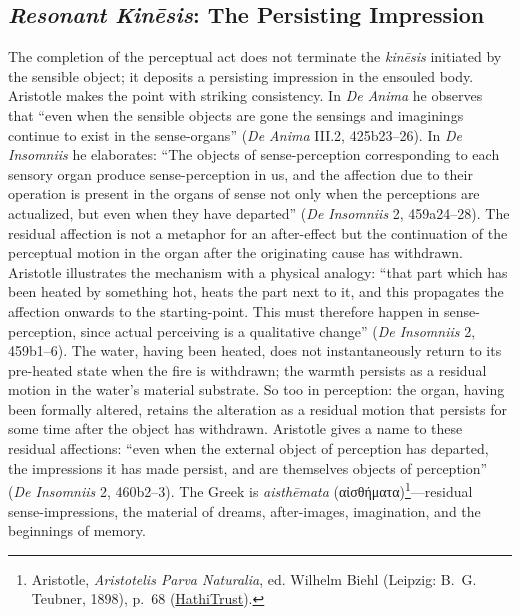 \documentclass{article}
\newcommand{\gk}[1]{{\greekfont #1}}
\begin{document}
\subsection{\textit{Resonant Kinēsis}: The Persisting Impression}

The completion of the perceptual act does not terminate the \textit{kinēsis} initiated by the sensible object; it deposits a persisting impression in the ensouled body. Aristotle makes the point with striking consistency. In \textit{De Anima} he observes that ``even when the sensible objects are gone the sensings and imaginings continue to exist in the sense-organs'' (\textit{De Anima} III.2, 425b23--26). In \textit{De Insomniis} he elaborates: ``The objects of sense-perception corresponding to each sensory organ produce sense-perception in us, and the affection due to their operation is present in the organs of sense not only when the perceptions are actualized, but even when they have departed'' (\textit{De Insomniis} 2, 459a24--28). The residual affection is not a metaphor for an after-effect but the continuation of the perceptual motion in the organ after the originating cause has withdrawn. Aristotle illustrates the mechanism with a physical analogy: ``that part which has been heated by something hot, heats the part next to it, and this propagates the affection onwards to the starting-point. This must therefore happen in sense-perception, since actual perceiving is a qualitative change'' (\textit{De Insomniis} 2, 459b1--6). The water, having been heated, does not instantaneously return to its pre-heated state when the fire is withdrawn; the warmth persists as a residual motion in the water's material substrate. So too in perception: the organ, having been formally altered, retains the alteration as a residual motion that persists for some time after the object has withdrawn. Aristotle gives a name to these residual affections: ``even when the external object of perception has departed, the impressions it has made persist, and are themselves objects of perception'' (\textit{De Insomniis} 2, 460b2--3). The Greek is \textit{aisthēmata} (\gk{αἰσθήματα})\footnote{Aristotle, \textit{Aristotelis Parva Naturalia}, ed. Wilhelm Biehl (Leipzig: B.~G. Teubner, 1898), p.~68 (\href{https://catalog.hathitrust.org/Record/001227560/Home}{HathiTrust}).}---residual sense-impressions, the material of dreams, after-images, imagination, and the beginnings of memory.
\end{document}
